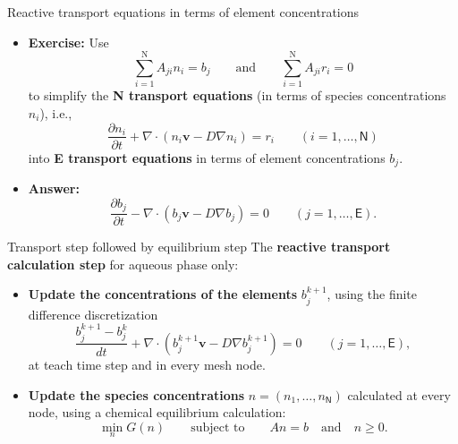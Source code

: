 %
%
\begin{frame}{Reactive transport equations in terms of element concentrations}

\small
\begin{itemize}
\item \textbf{Exercise:} Use 
\[
\sum_{i=1}^{\mathrm{N}}A_{ji}n_{i}=b_{j}\qquad\text{and}\qquad\sum_{i=1}^{\mathrm{N}}A_{ji}r_{i}=0
\]
to simplify the \textbf{N transport equations} (in terms of species
concentrations $n_{i}$), i.e., 
\[
\frac{\partial n_{i}}{\partial t}+\nabla\cdot(n_{i}\boldsymbol{v}-D\nabla n_{i})=r_{i}\qquad(i=1,\ldots,\mathsf{N})
\]
into \textbf{E transport equations} in terms of element concentrations
$b_{j}$. 
\hiddenpause
\item \textbf{Answer:}
\[
\frac{\partial b_{j}}{\partial t}-\nabla\cdot(b_{j}\boldsymbol{v}-D\nabla b_{j})=0\qquad(j=1,\ldots,\mathsf{E}).
\]
\end{itemize}
\end{frame}
%
%
\begin{frame}{Transport step followed by equilibrium step}
The \alert{\bf reactive transport calculation step} for aqueous phase only:
\begin{itemize}
\item {\bf Update the concentrations of the elements} $b_{j}^{k+1}$, using the finite difference discretization
\[
\frac{b^{k+1}_{j} - b^k_{j}}{dt}+\nabla\cdot(b^{k+1}_{j}\boldsymbol{v}-D\nabla b^{k+1}_{j})=0\qquad(j=1,\ldots,\mathsf{E}),
\]
%
at teach time step and in every mesh node.
%
\item {\bf Update the species concentrations} $n=(n_{1},\ldots,n_{\mathsf{N}})$
calculated at every node, using a chemical equilibrium calculation:
\[
\min_{n}G(n)\qquad\text{subject to}\qquad An=b\quad\text{and}\quad n\geq0.
\]
\end{itemize}
\end{frame}
